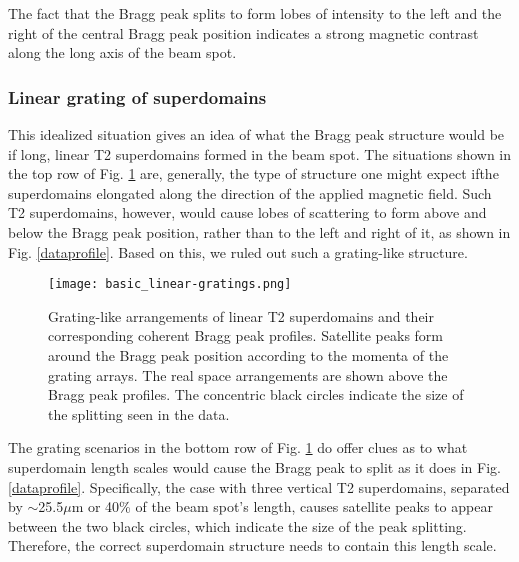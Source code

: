 \documentclass[aps, prb, reprint, showpacs, superscriptaddress]{revtex4-1}
\begin{document}
The fact that the Bragg peak splits to form lobes of intensity to the left and the right of the central Bragg peak position indicates a strong magnetic contrast along the long axis of the beam spot.

		\subsubsection{Linear grating of superdomains}

This idealized situation gives an idea of what the Bragg peak structure would be if long, linear T2 superdomains formed in the beam spot.
The situations shown in the top row of Fig. \ref{gratings} are, generally, the type of structure one might expect ifthe superdomains elongated along the direction of the applied magnetic field.
Such T2 superdomains, however, would cause lobes of scattering to form above and below the Bragg peak position, rather than to the left and right of it, as shown in Fig. \ref{dataprofile}.
Based on this, we ruled out such a grating-like structure.

\begin{figure}[ht]
\begin{center}
\texttt{[image: basic\_linear-gratings.png]}
\caption {
Grating-like arrangements of linear T2 superdomains and their corresponding coherent Bragg peak profiles. 
Satellite peaks form around the Bragg peak position according to the momenta of the grating arrays.
The real space arrangements are shown above the Bragg peak profiles. 
The concentric black circles indicate the size of the splitting seen in the data. 
}  \label{gratings}
\end{center}
\end{figure}

The grating scenarios in the bottom row of Fig. \ref{gratings} do offer clues as to what superdomain length scales would cause the Bragg peak to split as it does in Fig. \ref{dataprofile}.
Specifically, the case with three vertical T2 superdomains, separated by $\sim$25.5$\mu$m or 40\% of the beam spot's length, causes satellite peaks to appear between the two black circles, which indicate the size of the peak splitting.
Therefore, the correct superdomain structure needs to contain this length scale.

\end{document}
